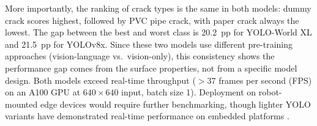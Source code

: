 \documentclass[conference]{IEEEtran}
\begin{document}
More importantly, the ranking of crack types is the same in both models: dummy crack scores highest, followed by PVC pipe crack, with paper crack always the lowest. The gap between the best and worst class is 20.2~pp for YOLO-World XL and 21.5~pp for YOLOv8x. Since these two models use different pre-training approaches (vision-language vs.\ vision-only), this consistency shows the performance gap comes from the surface properties, not from a specific model design. Both models exceed real-time throughput ($>$37 frames per second (FPS) on an A100 GPU at $640 \times 640$ input, batch size 1). Deployment on robot-mounted edge devices would require further benchmarking, though lighter YOLO variants have demonstrated real-time performance on embedded platforms \cite{li2024sewer}.

\begin{table}[htbp]
\caption{YOLO-World XL vs.\ YOLOv8x (Mean $\pm$ Std, 5 Seeds)}
\label{tab:model_comparison}
\centering
{}
\end{table}
\end{document}

